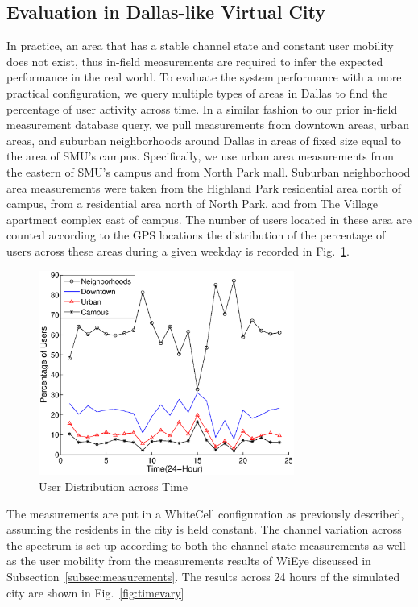 \subsection{Evaluation in Dallas-like Virtual City}
\label{subsec:virtualcity}
In practice, an area that has a stable channel state and constant user mobility does not exist, thus in-field measurements are required to infer the expected performance in the real world.
To evaluate the system performance with a more practical configuration, we query multiple types of areas in Dallas to find the percentage of user activity across time.
In a similar fashion to our prior in-field measurement database query, we pull measurements from downtown areas, urban areas, and suburban neighborhoods around Dallas in areas of fixed size equal to the area of SMU's campus.
Specifically, we use urban area measurements from the eastern of SMU's campus and from North Park mall. 
Suburban neighborhood area measurements were taken from the Highland Park residential area north of campus, from a residential area north of North Park, and from The Village apartment complex east of campus. 
The number of users located in these area are counted according to the GPS locations the distribution of the percentage of users across these areas during a given weekday is recorded in Fig.~\ref{fig:wieyeprocess}. 


\begin{figure}
\vspace{-0.01in}
\centering
\includegraphics[width=84mm]{figures/wieyeprocess}
\vspace{-0.1in}
\caption{User Distribution across Time}
\label{fig:wieyeprocess}
\vspace{-0.3in}
\end{figure}


The measurements are put in a WhiteCell configuration as previously described, assuming the residents in the city is held constant. 
The channel variation across the spectrum is set up according to both the channel state measurements as well as the user mobility from the measurements results of WiEye discussed in 
Subsection~\ref{subsec:measurements}. The results across 24 hours of the simulated city 
are shown in Fig.~\ref{fig:timevary}

